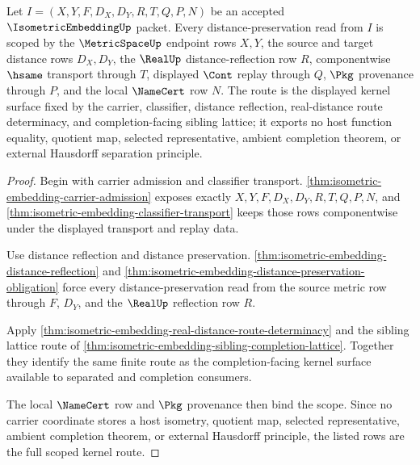 \begin{theorem}
\label{thm:isometric-embedding-scoped-kernel-route}
Let $I=(X,Y,F,D_X,D_Y,R,T,Q,P,N)$ be an accepted $\IsometricEmbeddingUp$ packet. Every distance-preservation read from $I$ is scoped by the $\MetricSpaceUp$ endpoint rows $X,Y$, the source and target distance rows $D_X,D_Y$, the $\RealUp$ distance-reflection row $R$, componentwise $\hsame$ transport through $T$, displayed $\Cont$ replay through $Q$, $\Pkg$ provenance through $P$, and the local $\NameCert$ row $N$. The route is the displayed kernel surface fixed by the carrier, classifier, distance reflection, real-distance route determinacy, and completion-facing sibling lattice; it exports no host function equality, quotient map, selected representative, ambient completion theorem, or external Hausdorff separation principle.
\end{theorem}
\begin{proof}
Begin with carrier admission and classifier transport. \autoref{thm:isometric-embedding-carrier-admission} exposes exactly $X,Y,F,D_X,D_Y,R,T,Q,P,N$, and \autoref{thm:isometric-embedding-classifier-transport} keeps those rows componentwise under the displayed transport and replay data.

Use distance reflection and distance preservation. \autoref{thm:isometric-embedding-distance-reflection} and \autoref{thm:isometric-embedding-distance-preservation-obligation} force every distance-preservation read from the source metric row through $F$, $D_Y$, and the $\RealUp$ reflection row $R$.

Apply \autoref{thm:isometric-embedding-real-distance-route-determinacy} and the sibling lattice route of \autoref{thm:isometric-embedding-sibling-completion-lattice}. Together they identify the same finite route as the completion-facing kernel surface available to separated and completion consumers.

The local $\NameCert$ row and $\Pkg$ provenance then bind the scope. Since no carrier coordinate stores a host isometry, quotient map, selected representative, ambient completion theorem, or external Hausdorff principle, the listed rows are the full scoped kernel route.
\end{proof}


